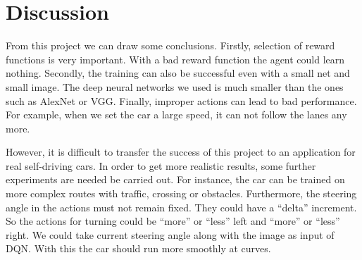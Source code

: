 
\section{Discussion}\label{sec:discussion}

From this project we can draw some conclusions. Firstly, selection of reward functions is very important. With a bad reward function the agent could learn nothing. Secondly, the training can also be successful even with a small net and small image. The deep neural networks we used is much smaller than the ones such as AlexNet or VGG. Finally, improper actions can lead to bad performance. For example, when we set the car a large speed, it can not follow the lanes any more.

However, it is difficult to transfer the success of this project to an application for real self-driving cars. In order to get more realistic results, some further experiments are needed be carried out. For instance, the car can be trained on more complex routes with traffic, crossing or obstacles. Furthermore, the steering angle in the actions must not remain fixed. They could have a ``delta'' increment. So the actions for turning could be ``more'' or ``less'' left and ``more'' or ``less'' right. We could take current steering angle along with the image as input of DQN. With this the car should run more smoothly at curves. 